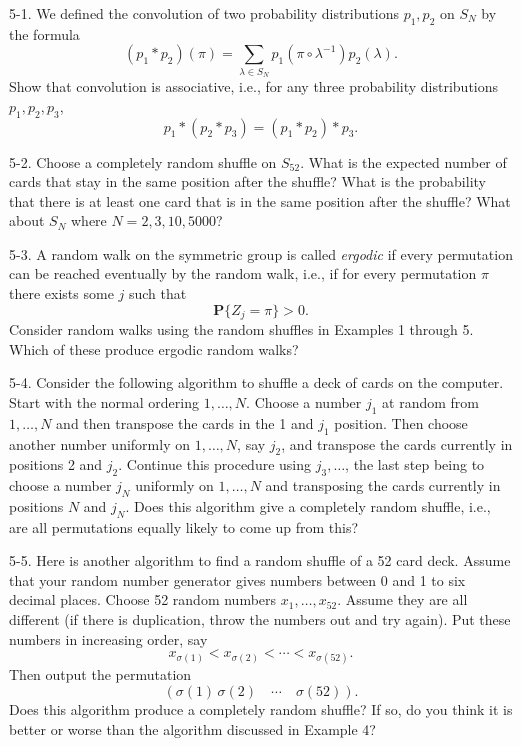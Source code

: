 \documentclass{stml-l}
\theoremstyle{definition}
\numberwithin{equation}{chapter}
\numberwithin{figure}{chapter}
\numberwithin{figure}{section}
\begin{document}
5-1. We defined the convolution of two probability distributions
$p_{1},p_{2}$ on $S_{N}$ by the formula
\begin{equation*}
(p_{1}\ast p_{2})(\pi)=\sum\limits_{\lambda\in S_{N}}p_{1}(\pi \circ
\lambda^{-1})p_{2}(\lambda).
\end{equation*}
Show that convolution is associative, i.e., for any three
probability distributions $p_{1},p_{2},p_{3}$,
\begin{equation*}
p_{1}\ast (p_{2}\ast p_{3})=(p_{1}\ast p_{2})\ast p_{3}.
\end{equation*}

5-2. Choose a completely random shuffle on $S_{52}$. What is the
expected number of cards that stay in the same position after the
shuffle? What is the probability that there is at least one card
that is in the same position after the shuffle? What about $S_{N}$
where $N=2,3,10,5000$?

5-3. A random walk on the symmetric group is called \emph{ergodic}
if every permutation can be reached eventually by the random walk,
i.e., if for every permutation $\pi$ there exists some $j$ such that
\begin{equation*}
\mathbf{P}\{Z_{j}=\pi\}>0.
\end{equation*}
Consider random walks using the random shuffles in Examples 1
through 5. Which of these produce ergodic random walks?

5-4. Consider the following algorithm to shuffle a deck of cards on
the computer. Start with the normal ordering $1,\ldots, N$. Choose a
number $j_{1}$ at random from $1,\ldots, N$ and then transpose the
cards in the 1 and $j_{1}$ position. Then choose another number
uniformly on $1,\ldots, N$, say $j_{2}$, and transpose the cards
currently in positions 2 and $j_{2}$. Continue this procedure using
$j_{3},\ldots$, the last step being to choose a number $j_{N}$
uniformly on $1,\ldots,N$ and transposing the cards currently in
positions $N$ and $j_{N}$. Does this algorithm give a completely
random shuffle, i.e., are all permutations equally likely to come up
from this?

5-5. Here is another algorithm to find a random shuffle of a 52 card
deck. Assume that your random number generator gives numbers between
$0$ and 1 to six decimal places. Choose 52 random numbers
$x_{1},\ldots,x_{52}$. Assume they are all different (if there is
duplication, throw the numbers out and try again). Put these numbers
in increasing order, say
\begin{equation*}
x_{\sigma(1)}<x_{\sigma(2)}<\cdots<x_{\sigma(52)}.
\end{equation*}
Then output the permutation
\begin{equation*}
(\sigma(1)\,\sigma(2)\quad\cdots\quad \sigma(52)).
\end{equation*}
Does this algorithm produce a completely random shuffle? If so, do
you think it is better or worse than the algorithm discussed in
Example 4?
\end{document}
